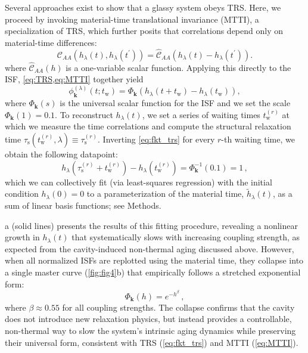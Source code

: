 \documentclass[aps, prl,
 reprint,
 superscriptaddress,
 citeautoscript,
 amsmath,amssymb,
 tightenlines
]{revtex4-2}
\begin{document}
Several approaches exist to show that a glassy system obeys TRS.\cite{ghimenti2024cleveralgorithmsglassesdo,Kurchan2023}
Here, we proceed by invoking material-time translational invariance (MTTI),\cite{bohmer2024time} a specialization of TRS, which further posits that correlations depend only on material-time differences:
\begin{equation}
\mathcal{C}_{AA}(h_\lambda(t),h_\lambda(t^\prime))=\mathcal{\widehat{C}}_{AA}\!\left(h_\lambda(t)-h_\lambda(t^\prime)\right). \label{eq:MTTI}
\end{equation}
where $\mathcal{\widehat{C}}_{AA}(h)$ is a one-variable scalar function. Applying this directly to the ISF, \cref{eq:TRS,eq:MTTI} together yield
\begin{equation}
\phi_{\bm k}^{(\lambda)}(t; t_\mathrm{w}) = \Phi_{\bm k}(h_\lambda(t+t_\mathrm{w})-h_\lambda(t_\mathrm{w})), \label{eq:fkt_trs}
\end{equation}
where $\Phi_{\bm k}(s)$ is the universal scalar function for the ISF and we set the scale $\Phi_{\bm k}(1) = 0.1$. 
To reconstruct $h_\lambda(t)$, we set a series of waiting times $t_\mathrm{w}^{(r)}$ at which we measure the time correlations and compute the structural relaxation time $\tau_\mathrm{s}(t_\mathrm{w}^{(r)},\lambda) \equiv \tau_\mathrm{s}^{(r)}$. 
Inverting \cref{eq:fkt_trs} for every $r$-th waiting time, we obtain the following datapoint:
\begin{equation}
h_\lambda(\tau_\mathrm{s}^{(r)}+t_\mathrm{w}^{(r)}) - h_\lambda(t_\mathrm{w}^{(r)}) =  \Phi_{\bm k}^{-1}(0.1) = 1 \,, \label{eq:const_mtti}
\end{equation}
which we can collectively fit (via least-squares regression) with the initial condition $h_\lambda(0) = 0$ to a parameterization of the material time, $\tilde{h}_\lambda(t)$, as a sum of linear basis functions; see Methods. 

a (solid lines) presents the results of this fitting procedure, revealing a nonlinear growth in $h_\lambda(t)$ that systematically slows with increasing coupling strength, as expected from the cavity-induced non-thermal aging discussed above. However, when all normalized ISFs are replotted using the material time, they collapse into a single master curve (\cref{fig:fig4}b) that empirically follows a stretched exponential form: 
\begin{equation}
\Phi_{\bm k}(h) = e^{-h^\beta} \,, \label{eq:stretchexp}
\end{equation}
where $\beta \approx 0.55$ for all coupling strengths. The collapse confirms that the cavity does not introduce new relaxation physics, but instead provides a controllable, non-thermal way to slow the system’s intrinsic aging dynamics while preserving their universal form, consistent with TRS (\cref{eq:fkt_trs}) and MTTI (\cref{eq:MTTI}).
\end{document}
